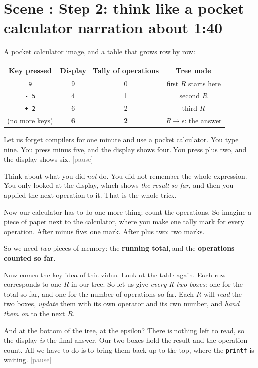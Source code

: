 \documentclass[11pt,a4paper]{article}
\newcommand{\pause}{\textcolor{gray}{\textsf{[pause]}}}
\newcounter{scene}
\newcommand{\scene}[2]{\stepcounter{scene}\needspace{20\baselineskip}\section*{Scene \thescene: #1 \hfill {\normalfont\small #2}}}
\begin{document}
\scene{Step 2: think like a pocket calculator}{narration about 1:40}

\begin{onscreen}
A pocket calculator image, and a table that grows row by row:
\begin{center}
\begin{tabular}{@{}c c c c@{}}
\toprule
\textbf{Key pressed} & \textbf{Display} & \textbf{Tally of operations} & \textbf{Tree node} \\ \midrule
\texttt{9} & 9 & 0 & first $R$ starts here \\
\texttt{- 5} & 4 & 1 & second $R$ \\
\texttt{+ 2} & 6 & 2 & third $R$ \\
(no more keys) & \textbf{6} & \textbf{2} & $R\to\epsilon$: the answer \\ \bottomrule
\end{tabular}
\end{center}
\end{onscreen}

\begin{narration}
Let us forget compilers for one minute and use a pocket calculator. You type nine. You press minus five, and the display shows four. You press plus two, and the display shows six. \pause

Think about what you did \emph{not} do. You did not remember the whole expression. You only looked at the display, which shows \emph{the result so far}, and then you applied the next operation to it. That is the whole trick.

Now our calculator has to do one more thing: count the operations. So imagine a piece of paper next to the calculator, where you make one tally mark for every operation. After minus five: one mark. After plus two: two marks.

So we need \emph{two} pieces of memory: the \textbf{running total}, and the \textbf{operations counted so far}.

Now comes the key idea of this video. Look at the table again. Each row corresponds to one $R$ in our tree. So let us give \emph{every $R$ two boxes}: one for the total so far, and one for the number of operations so far. Each $R$ will \emph{read} the two boxes, \emph{update} them with its own operator and its own number, and \emph{hand them on} to the next $R$.

And at the bottom of the tree, at the epsilon? There is nothing left to read, so the display \emph{is} the final answer. Our two boxes hold the result and the operation count. All we have to do is to bring them back up to the top, where the \texttt{printf} is waiting. \pause
\end{narration}
\end{document}
